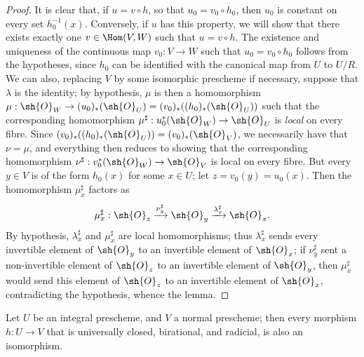 \begin{proof}
It is clear that, if $u=v\circ h$, so that $u_0=v_0\circ h_0$, then $u_0$ is constant on every set $h_0^{-1}(x)$.
Conversely, if $u$ has this property, we will show that there exists exactly one $v\in\Hom(V,W)$ such that $u=v\circ h$.
The existence and uniqueness of the continuous map $v_0:V\to W$ such that $u_0=v_0\circ h_0$ follows from the hypotheses, since $h_0$ can be identified with the canonical map from $U$ to $U/R$.
We can also, replacing $V$ by some isomorphic prescheme if necessary, suppose that $\lambda$ is the identity;
by hypothesis, $\mu$ is then a homomorphism $\mu:\sh{O}_W\to(u_0)_*(\sh{O}_U) = (v_0)_*((h_0)_*(\sh{O}_U))$ such that the corresponding homomorphism $\mu^\sharp:u_0^*(\sh{O}_W)\to\sh{O}_U$ is \emph{local} on every fibre.
Since $(v_0)_*((h_0)_*(\sh{O}_U))=(v_0)_*(\sh{O}_V)$, we necessarily have that $\nu=\mu$, and everything then reduces to showing that the corresponding homomorphism $\nu^\sharp:v_0^*(\sh{O}_W)\to\sh{O}_V$ is local on every fibre.
But every $y\in V$ is of the form $h_0(x)$ for some $x\in U$;
let $z=v_0(y)=u_0(x)$.
Then  the homomorphism $\mu_x^\sharp$ factors as
\[
    \mu_x^\sharp: \sh{O}_z \xrightarrow{\nu_y^\sharp} \sh{O}_y \xrightarrow{\lambda_x^\sharp} \sh{O}_x.
\]
By hypothesis, $\lambda_x^\sharp$ and $\mu_x^\sharp$ are local homomorphisms;
thus $\lambda_x^\sharp$ sends every invertible element of $\sh{O}_y$ to an invertible element of $\sh{O}_x$;
if $\nu_y^\sharp$ sent a non-invertible element of $\sh{O}_z$ to an invertible element of $\sh{O}_y$, then $\mu_x^\sharp$ would send this element of $\sh{O}_z$ to an invertible element of $\sh{O}_x$, contradicting the hypothesis, whence the lemma.
\end{proof}

\begin{corollary}[8.11.2]
\label{II.8.11.2}
Let $U$ be an integral prescheme, and $V$ a normal prescheme;
then every morphism $h:U\to V$ that is universally closed, birational, and radicial, is also an isomorphism.
\end{corollary}

